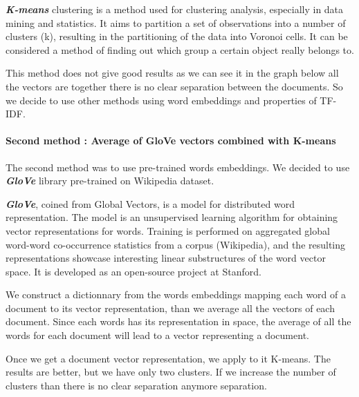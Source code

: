 \documentclass[journal,twocolumn]{IEEEtran}
\begin{document}
\textbf{\emph{K-means}} clustering is a method used for clustering
analysis, especially in data mining and statistics. It aims to partition
a set of observations into a number of clusters (k), resulting in the
partitioning of the data into Voronoi cells. It can be considered a
method of finding out which group a certain object really belongs to.

This method does not give good results as we can see it in the graph
below all the vectors are together there is no clear separation between
the documents. So we decide to use other methods using word embeddings
and properties of TF-IDF.


    \begin{figure}
        \begin{center}\end{center}
        \caption{}
        \label{}
    \end{figure}
    
    \paragraph{Second method : Average of GloVe vectors combined with
K-means}\label{second-method-average-of-glove-vectors-combined-with-k-means}

The second method was to use pre-trained words embeddings. We decided to
use \textbf{\emph{GloVe}} library pre-trained on Wikipedia dataset.

\textbf{\emph{GloVe}}, coined from Global Vectors, is a model for
distributed word representation. The model is an unsupervised learning
algorithm for obtaining vector representations for words. Training is
performed on aggregated global word-word co-occurrence statistics from a
corpus (Wikipedia), and the resulting representations showcase
interesting linear substructures of the word vector space. It is
developed as an open-source project at Stanford.\cite{GloVe}

We construct a dictionnary from the words embeddings mapping each word
of a document to its vector representation, than we average all the
vectors of each document. Since each words has its representation in
space, the average of all the words for each document will lead to a
vector representing a document.

Once we get a document vector representation, we apply to it K-means.
The results are better, but we have only two clusters. If we increase
the number of clusters than there is no clear separation anymore
separation.
\end{document}
